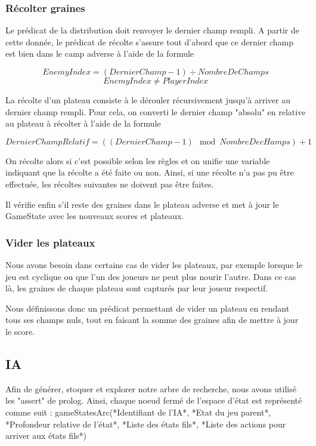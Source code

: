 \documentclass[]{article}
\begin{document}
\subsubsection{Récolter graines}

Le prédicat de la distribution doit renvoyer le dernier champ rempli. A partir de cette donnée, le prédicat de récolte s'assure tout d'abord que ce dernier champ est bien dans le camp adverse à l'aide de la formule 

$$EnemyIndex = (DernierChamp-1) \div NombreDeChamps$$
$$EnemyIndex \neq PlayerIndex$$

La récolte d'un plateau consiste à le dérouler récursivement jusqu'à arriver au dernier champ rempli. Pour cela, on converti le dernier champ "absolu" en relative au plateau à récolter à l'aide de la formule

$$DernierChampRelatif = ((DernierChamp-1) \mod NombreDecHamps) + 1$$

On récolte alors si c'est possible selon les règles et on unifie une variable indiquant que la récolte a été faite ou non. Ainsi, si une récolte n'a pas pu être effectuée, les récoltes suivantes ne doivent pas être faites.


Il vérifie enfin s'il reste des graines dans le plateau adverse et met à jour le GameState avec les nouveaux scores et plateaux.


\subsubsection{Vider les plateaux}


Nous avons besoin dans certains cas de vider les plateaux, par exemple lorsque le jeu est cyclique ou que l'un des joueurs ne peut plus nourir l'autre. Dans ce cas là, les graines de chaque plateau sont capturés par leur joueur respectif.

Nous définissons donc un prédicat permettant de vider un plateau en rendant tous ses champs nuls, tout en faisant la somme des graines afin de mettre à jour le score. 

\subsection{IA}

Afin de générer, stoquer et explorer notre arbre de recherche, nous avons utilisé les "assert" de prolog. Ainsi, chaque noeud fermé de l'espace d'état est représenté comme suit :
	gameStatesArc(*Identifiant de l'IA*, *Etat du jeu parent*, *Profondeur relative de l'état*, *Liste des états fils*, *Liste des actions pour arriver aux états fils*)
\end{document}
